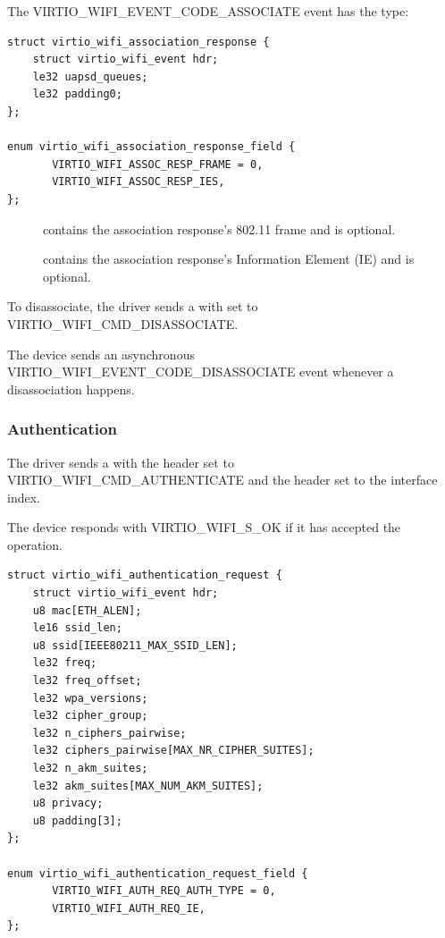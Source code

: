 The VIRTIO_WIFI_EVENT_CODE_ASSOCIATE event has the type:


\begin{lstlisting}
struct virtio_wifi_association_response {
	struct virtio_wifi_event hdr;
	le32 uapsd_queues;
	le32 padding0;
};

enum virtio_wifi_association_response_field {
       VIRTIO_WIFI_ASSOC_RESP_FRAME = 0,
       VIRTIO_WIFI_ASSOC_RESP_IES,
};
\end{lstlisting}

\begin{description}
  \item[] contains the association response's 802.11 frame and is optional.

\item[] contains the association response's Information Element (IE) and is optional.
\end{description}

To disassociate, the driver sends a  with  set to VIRTIO_WIFI_CMD_DISASSOCIATE.

The device sends an asynchronous VIRTIO_WIFI_EVENT_CODE_DISASSOCIATE event whenever a disassociation happens.

\subsubsection{Authentication}\label{sec:Device Types / 802.11 Device / Device Operation / Authentication}

The driver sends a  with the header  set to VIRTIO_WIFI_CMD_AUTHENTICATE and the header  set to the interface index.

The device responds with VIRTIO_WIFI_S_OK if it has accepted the operation.

\begin{lstlisting}
struct virtio_wifi_authentication_request {
	struct virtio_wifi_event hdr;
	u8 mac[ETH_ALEN];
	le16 ssid_len;
	u8 ssid[IEEE80211_MAX_SSID_LEN];
	le32 freq;
	le32 freq_offset;
	le32 wpa_versions;
	le32 cipher_group;
	le32 n_ciphers_pairwise;
	le32 ciphers_pairwise[MAX_NR_CIPHER_SUITES];
	le32 n_akm_suites;
	le32 akm_suites[MAX_NUM_AKM_SUITES];
	u8 privacy;
	u8 padding[3];
};

enum virtio_wifi_authentication_request_field {
       VIRTIO_WIFI_AUTH_REQ_AUTH_TYPE = 0,
       VIRTIO_WIFI_AUTH_REQ_IE,
};
\end{lstlisting}


